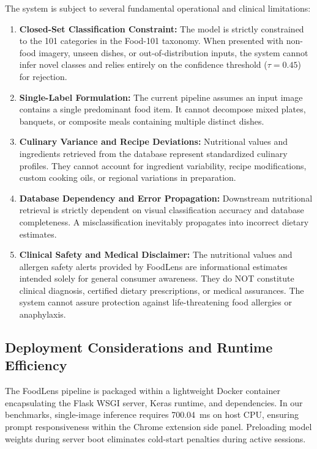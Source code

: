 \documentclass[conference]{IEEEtran}
\begin{document}
The system is subject to several fundamental operational and clinical limitations:
\begin{enumerate}
    \item \textbf{Closed-Set Classification Constraint:} The model is strictly constrained to the 101 categories in the Food-101 taxonomy. When presented with non-food imagery, unseen dishes, or out-of-distribution inputs, the system cannot infer novel classes and relies entirely on the confidence threshold ($\tau = 0.45$) for rejection.
    \item \textbf{Single-Label Formulation:} The current pipeline assumes an input image contains a single predominant food item. It cannot decompose mixed plates, banquets, or composite meals containing multiple distinct dishes.
    \item \textbf{Culinary Variance and Recipe Deviations:} Nutritional values and ingredients retrieved from the database represent standardized culinary profiles. They cannot account for ingredient variability, recipe modifications, custom cooking oils, or regional variations in preparation.
    \item \textbf{Database Dependency and Error Propagation:} Downstream nutritional retrieval is strictly dependent on visual classification accuracy and database completeness. A misclassification inevitably propagates into incorrect dietary estimates.
    \item \textbf{Clinical Safety and Medical Disclaimer:} The nutritional values and allergen safety alerts provided by FoodLens are informational estimates intended solely for general consumer awareness. They do NOT constitute clinical diagnosis, certified dietary prescriptions, or medical assurances. The system cannot assure protection against life-threatening food allergies or anaphylaxis.
\end{enumerate}

\subsection{Deployment Considerations and Runtime Efficiency}
The FoodLens pipeline is packaged within a lightweight Docker container encapsulating the Flask WSGI server, Keras runtime, and dependencies. In our benchmarks, single-image inference requires 700.04~ms on host CPU, ensuring prompt responsiveness within the Chrome extension side panel. Preloading model weights during server boot eliminates cold-start penalties during active sessions.
\end{document}
